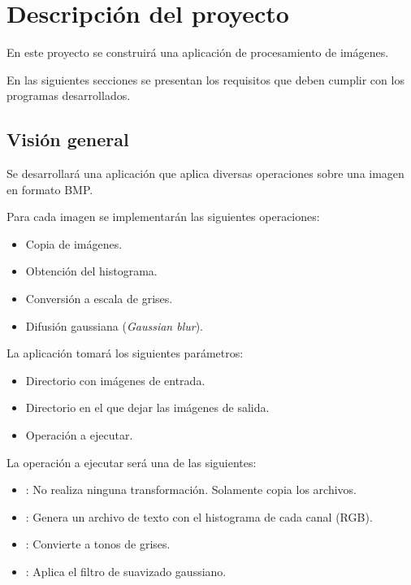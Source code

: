 \section{Descripción del proyecto}

En este proyecto se construirá una aplicación de procesamiento de imágenes.

En las siguientes secciones se presentan los requisitos que deben cumplir
con los programas desarrollados.

\subsection{Visión general}

Se desarrollará una aplicación que aplica diversas operaciones
sobre una imagen en formato BMP.

Para cada imagen se implementarán las siguientes operaciones:

\begin{itemize}
\item Copia de imágenes.
\item Obtención del histograma.
\item Conversión a escala de grises.
\item Difusión gaussiana (\emph{Gaussian blur}).
\end{itemize}

La aplicación tomará los siguientes parámetros:

\begin{itemize}

\item Directorio con imágenes de entrada.
\item Directorio en el que dejar las imágenes de salida.
\item Operación a ejecutar.

\end{itemize}

La operación a ejecutar será una de las siguientes:

\begin{itemize}

\item {}: No realiza ninguna transformación. Solamente
copia los archivos.
\item {}: Genera un archivo de texto con el histograma de cada canal (RGB).
\item {}: Convierte a tonos de grises.
\item {}: Aplica el filtro de suavizado gaussiano.

\end{itemize}

